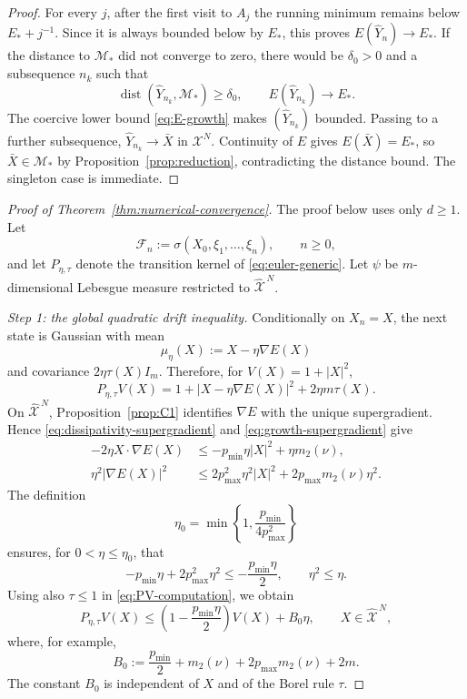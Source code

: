 \documentclass[11pt]{article}
\def\Fc{{\mathcal F}}
\def\Mc{{\mathcal M}}
\def\Xc{{\mathcal X}}
\def\hX{\widehat{\Xc}^{\,N}}
\newcommand{\dist}{\operatorname{dist}}
\newcommand{\pmin}{p_{\min}}
\newcommand{\pmax}{p_{\max}}
\theoremstyle{definition}
\theoremstyle{remark}
\numberwithin{equation}{section}
\begin{document}
\begin{proof}
For every $j$, after the first visit to $A_j$ the running minimum remains below $E_*+j^{-1}$.
Since it is always bounded below by $E_*$, this proves
$E(\widehat Y_n)\to E_*$.  If the distance to $\Mc_*$ did not converge to zero, there would be
$\delta_0>0$ and a subsequence $n_k$ such that
\[
 \dist(\widehat Y_{n_k},\Mc_*)\ge\delta_0,
 \qquad
 E(\widehat Y_{n_k})\longrightarrow E_*.
\]
The coercive lower bound \eqref{eq:E-growth} makes $(\widehat Y_{n_k})$ bounded.  Passing to a
further subsequence, $\widehat Y_{n_k}\to\bar X$ in $\Xc^N$.  Continuity of $E$ gives
$E(\bar X)=E_*$, so $\bar X\in\Mc_*$ by Proposition~\ref{prop:reduction}, contradicting the
distance bound.  The singleton case is immediate.
\end{proof}

\begin{proof}[Proof of Theorem~\ref{thm:numerical-convergence}]
The proof below uses only $d\ge1$.  Let
\begin{equation}\label{eq:discrete-filtration}
 \Fc_n:=\sigma(X_0,\xi_1,\ldots,\xi_n),
 \qquad n\ge0,
\end{equation}
and let $P_{\eta,\tau}$ denote the transition kernel of \eqref{eq:euler-generic}.  Let $\psi$ be
$m$-dimensional Lebesgue measure restricted to $\hX$.

\smallskip
\noindent\textit{Step 1: the global quadratic drift inequality.}
Conditionally on $X_n=X$, the next state is Gaussian with mean
\[
 \mu_\eta(X):=X-\eta\nabla E(X)
\]
and covariance $2\eta\tau(X)I_m$.  Therefore, for $V(X)=1+|X|^2$,
\begin{equation}\label{eq:PV-computation}
 P_{\eta,\tau}V(X)
 =1+|X-\eta\nabla E(X)|^2+2\eta m\tau(X).
\end{equation}
On $\hX$, Proposition~\ref{prop:C1} identifies $\nabla E$ with the unique supergradient.  Hence
\eqref{eq:dissipativity-supergradient} and \eqref{eq:growth-supergradient} give
\begin{align}
 -2\eta X\cdot\nabla E(X)
 &\le-\pmin\eta|X|^2+\eta m_2(\nu),
 \label{eq:drift-term-chain-detailed}\\
 \eta^2|\nabla E(X)|^2
 &\le2\pmax^2\eta^2|X|^2
 +2\pmax m_2(\nu)\eta^2.
 \label{eq:square-gradient-chain-detailed}
\end{align}
The definition
\[
 \eta_0=\min\left\{1,\frac{\pmin}{4\pmax^2}\right\}
\]
ensures, for $0<\eta\le\eta_0$, that
\begin{equation}\label{eq:step-size-two-consequences}
 -\pmin\eta+2\pmax^2\eta^2
 \le-\frac{\pmin\eta}{2},
 \qquad
 \eta^2\le\eta.
\end{equation}
Using also $\tau\le1$ in \eqref{eq:PV-computation}, we obtain
\begin{equation}\label{eq:global-drift-chain}
 P_{\eta,\tau}V(X)
 \le\left(1-\frac{\pmin\eta}{2}\right)V(X)+B_0\eta,
 \qquad X\in\hX,
\end{equation}
where, for example,
\[
 B_0:=\frac{\pmin}{2}+m_2(\nu)+2\pmax m_2(\nu)+2m.
\]
The constant $B_0$ is independent of $X$ and of the Borel rule $\tau$.


\end{proof}
\end{document}

